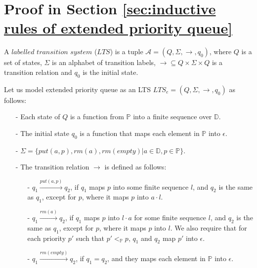 \section{Proof in Section \ref{sec:inductive rules of extended priority queue}}
\label{sec:appendix in section inductive rules of extended priority queue}

A $\textit{labelled transition system}$ ($LTS$) is a tuple $\mathcal{A}=(Q,\Sigma,\rightarrow,q_0)$, where $Q$ is a set of states, $\Sigma$ is an alphabet of transition labels, $\rightarrow\subseteq Q\times\Sigma\times Q$ is a transition relation and $q_0$ is the initial state.

Let us model extended priority queue as an LTS $\textit{LTS}_e = (Q,\Sigma,\rightarrow,q_0)$ as follows:

\begin{itemize}
\setlength{\itemsep}{0.5pt}
\item[-] Each state of $Q$ is a function from $\mathbb{P}$ into a finite sequence over $\mathbb{D}$.

\item[-] The initial state $q_0$ is a function that maps each element in $\mathbb{P}$ into $\epsilon$.

\item[-] $\Sigma = \{ \textit{put}(a,p),\textit{rm}(a),\textit{rm}(\textit{empty}) \vert a \in \mathbb{D}, p \in \mathbb{P} \}$.

\item[-] The transition relation $\rightarrow$ is defined as follows:

    \begin{itemize}
    \setlength{\itemsep}{0.5pt}
    \item[-] $q_1 \xrightarrow{\textit{put}(a,p)} q_2$, if $q_1$ maps $p$ into some finite sequence $l$, and $q_2$ is the same as $q_1$, except for $p$, where it maps $p$ into $a \cdot l$.

    \item[-] $q_1 \xrightarrow{\textit{rm}(a)} q_2$, if $q_1$ maps $p$ into $l \cdot a$ for some finite sequence $l$, and $q_2$ is the same as $q_1$, except for $p$, where it maps $p$ into $l$. We also require that for each priority $p'$ such that $p' <_{\mathbb{P}} p$, $q_1$ and $q_2$ map $p'$ into $\epsilon$.

    \item[-] $q_1 \xrightarrow{\textit{rm}(\textit{empty})} q_2$, if $q_1 = q_2$, and they maps each element in $\mathbb{P}$ into $\epsilon$.
    \end{itemize}
\end{itemize}

